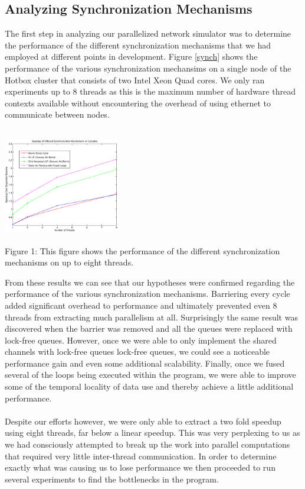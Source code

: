 \documentclass{article}
\begin{document}
\begin{multicols}{2}
\subsection{Analyzing Synchronization Mechanisms}
The first step in analyzing our parallelized network simulator was to
determine the performance of the different synchronization mechanisms that
we had employed at different points in development.  Figure \ref{synch}
shows the performance of the various synchronization mechansims on a
single node of the Hotbox cluster that consists of two Intel Xeon Quad
cores.  We only ran experiments up to 8 threads as this is the maximum
number of hardware thread contexts available without encountering the
overhead of using ethernet to communicate between nodes.\\
\begin{center}
\includegraphics[width=2in,height=2in]{synch.eps} \\
\small{Figure 1: This figure shows the performance of the different
synchronization mechanisms on up to eight threads.}
\end{center}
From these results we can see that our hypotheses were confirmed regarding
the performance of the various synchronization mechanisms.  Barriering
every cycle added significant overhead to performance and ultimately
prevented even 8 threads from extracting much parallelism at all.
Surprisingly the same result was discovered when the barrier was removed and
all the queues were replaced with lock-free queues.  However, once we were
able to only implement the shared channels with lock-free queues lock-free
queues, we could see a noticeable performance gain and even some
additional scalability.  Finally, once we fused several of the loops being
executed within the program, we were able to improve some of the temporal
locality of data use and thereby achieve a little additional
performance.\\
~\\
Despite our efforts however, we were only able to extract a two fold
speedup using eight threads, far below a linear speedup.  This was very
perplexing to us as we had consciously attempted to break up the work into
parallel computations that required very little inter-thread
communication.  In order to determine exactly what was causing us to lose
performance we then proceeded to run several experiments to find the
bottlenecks in the program.


\end{multicols}
\end{document}
